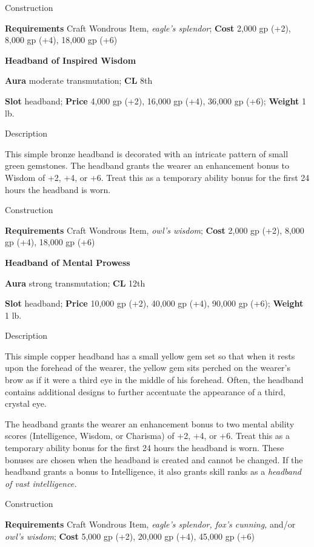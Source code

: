 Construction
				
\textbf{Requirements }Craft Wondrous Item, \textit{eagle's splendor}; \textbf{Cost} 2,000 gp (+2), 8,000 gp (+4), 18,000 gp (+6)
				
\textbf{Headband of Inspired Wisdom}
				
\textbf{Aura} moderate transmutation; \textbf{CL} 8th
				
\textbf{Slot }headband; \textbf{Price} 4,000 gp (+2), 16,000 gp (+4), 36,000 gp (+6); \textbf{Weight} 1 lb.
				
Description
				
This simple bronze headband is decorated with an intricate pattern of small green gemstones. The headband grants the wearer an enhancement bonus to Wisdom of +2, +4, or +6. Treat this as a temporary ability bonus for the first 24 hours the headband is worn.
				
Construction
				
\textbf{Requirements }Craft Wondrous Item, \textit{owl's wisdom}; \textbf{Cost} 2,000 gp (+2), 8,000 gp (+4), 18,000 gp (+6)
				
\textbf{Headband of Mental Prowess}
				
\textbf{Aura} strong transmutation; \textbf{CL} 12th
				
\textbf{Slot }headband; \textbf{Price} 10,000 gp (+2), 40,000 gp (+4), 90,000 gp (+6); \textbf{Weight} 1 lb.
				
Description
				
This simple copper headband has a small yellow gem set so that when it rests upon the forehead of the wearer, the yellow gem sits perched on the wearer's brow as if it were a third eye in the middle of his forehead. Often, the headband contains additional designs to further accentuate the appearance of a third, crystal eye.
				
The headband grants the wearer an enhancement bonus to two mental ability scores (Intelligence, Wisdom, or Charisma) of +2, +4, or +6. Treat this as a temporary ability bonus for the first 24 hours the headband is worn. These bonuses are chosen when the headband is created and cannot be changed. If the headband grants a bonus to Intelligence, it also grants skill ranks as a \textit{headband of vast intelligence.}
				
Construction
				
\textbf{Requirements }Craft Wondrous Item, \textit{eagle's splendor, fox's cunning, }and/or \textit{owl's wisdom}; \textbf{Cost} 5,000 gp (+2), 20,000 gp (+4), 45,000 gp (+6)
				
